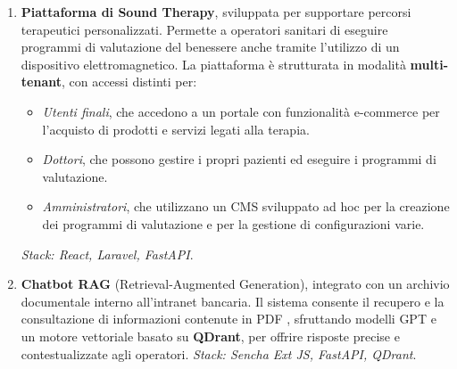 \begin{experiences}
{\begin{itemize}
\begin{enumerate}
\begin{itemize}
	\item Un'interfaccia \textbf{Next.js} per il pannello \textit{Admin}, dedicata alla gestione centrale del sistema (approvazioni, monitoraggio, censimenti, bandi, reportistica).
	\item Un'interfaccia \textbf{Next.js} per le \textit{Aziende}, con funzionalità di onboarding dipendenti, gestione fondi welfare e visualizzazione delle spese.
	\item Un'app \textbf{React Native} per gli \textit{Utenti finali (dipendenti)}, per la consultazione del credito disponibile, richiesta e utilizzo di voucher presso gli esercenti, ricerca di bandi e benefit.
	\item Un'app \textbf{React Native} per gli \textit{Esercenti}, per la gestione e riscossione dei voucher e la consultazione dello storico transazioni.
\end{itemize}

Il tutto è orchestrato tramite un backend centralizzato sviluppato in \textbf{Laravel}, che espone API REST e gestisce autenticazione, autorizzazioni, logiche di business, e integrazioni con sistemi esterni per l’emissione dei voucher e la gestione di bandi pubblici. 

			
		\item \textbf{Piattaforma di Sound Therapy}, sviluppata per supportare percorsi terapeutici personalizzati. Permette a operatori sanitari di eseguire programmi di valutazione del benessere anche tramite l'utilizzo di un dispositivo elettromagnetico. La piattaforma è strutturata in modalità \textbf{multi-tenant}, con accessi distinti per:
\begin{itemize}
	\item \textit{Utenti finali}, che accedono a un portale con funzionalità e-commerce per l'acquisto di prodotti e servizi legati alla terapia.
	\item \textit{Dottori}, che possono gestire i propri pazienti ed eseguire i programmi di valutazione.
	\item \textit{Amministratori}, che utilizzano un CMS sviluppato ad hoc per la creazione  dei programmi di valutazione e per la gestione di configurazioni varie. 
\end{itemize}
\textit{Stack: React, Laravel, FastAPI}.

\item \textbf{Chatbot RAG} (Retrieval-Augmented Generation), integrato con un archivio documentale interno all’intranet bancaria. Il sistema consente il recupero e la consultazione di informazioni contenute in PDF , sfruttando modelli GPT e un motore vettoriale basato su \textbf{QDrant}, per offrire risposte precise e contestualizzate agli operatori. \textit{Stack: Sencha Ext JS, FastAPI, QDrant}.


\end{enumerate}
\end{itemize}}
\end{experiences}
